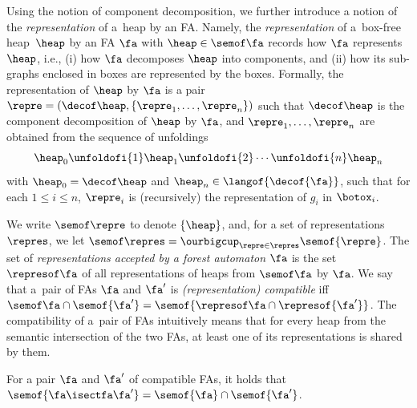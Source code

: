 {Using the notion of component decomposition, we further introduce a notion of
the \emph{representation} of a~heap by an FA. Namely, the \emph{representation}
of a~box-free heap~$\heap$ by an FA $\fa$ with $\heap\in\semof\fa$ records how
$\fa$ represents $\heap$, i.e., (i) how $\fa$ decomposes $\heap$ into
components, and (ii) how its sub-graphs enclosed in boxes are represented by the
boxes. 
%
Formally, the representation of $\heap$ by $\fa$ is a pair $\repre =
(\decof\heap,\{\repre_1,\ldots,\repre_n\})$ such that $\decof\heap$ is the
component decomposition of $\heap$ by $\fa$, and $\repre_1,\ldots,\repre_n$ are
obtained from the sequence of unfoldings\
%
\vspace{-1mm}
\begin{equation*}
\heap_0\unfoldofi{1} \heap_1 \unfoldofi{2}  \cdots \unfoldofi{n} \heap_n
\vspace{-1mm}
\end{equation*}
%
with $\heap_0 = \decof\heap$ and $\heap_n\in\langof{\decof{\fa}}$, such that for
each $1\leq i\leq n$, $\repre_i$ is (recursively) the representation of $g_i$ in
$\botox_i$.

We write $\semof\repre$ to denote $\{\heap\}$, and,
%
for a set of representations~$\repres$, we let $\semof\repres =
\ourbigcup_{\repre\in\repres} \semof{\repre}$.
%
The set of \emph{representations accepted by a forest automaton} $\fa$
is the set $\represof\fa$ of all representations of heaps from
$\semof\fa$ by $\fa$. 
%
We say that a~pair of FAs $\fa$ and $\fa'$ is \emph{(representation) compatible} iff $\semof \fa \cap
\semof {\fa'} = \semof{\represof \fa \cap \represof{\fa'}}$.
%
The compatibility of a~pair of FAs intuitively means that for every heap from the semantic intersection of the two FAs,
at least one of its representations is shared by them.
%

\begin{lemma}
  For a pair $\fa$ and $\fa'$ of compatible FAs,
  it holds that
  $\semof{\fa \isectfa \fa'} = \semof{\fa} \cap \semof{\fa'}$.
\end{lemma}


}
